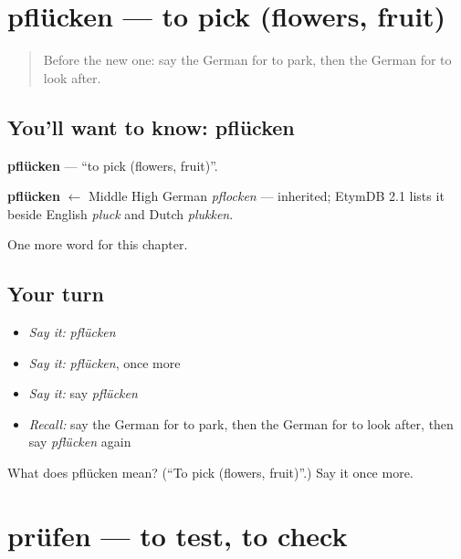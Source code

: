 \section[pflücken]{pflücken — to pick (flowers, fruit)}

\label{lesson:GE-C184-pfluecken}



\begin{quote}
Before the new one: say the German for to park, then the German for to look after.
\end{quote}

\subsection*{You'll want to know: pflücken}
\textbf{pflücken} — \textquotedblleft{}to pick (flowers, fruit)\textquotedblright{}.

\begin{cousinweb}
\textbf{pflücken} $\leftarrow$ Middle High German \emph{pflocken} — inherited; EtymDB 2.1 lists it beside English \emph{pluck} and Dutch \emph{plukken}.
\end{cousinweb}

\begin{grammarlens}[title={What you've built}]
One more word for this chapter.
\end{grammarlens}

\subsection*{Your turn}
\begin{itemize}
\raggedright
  \item \emph{Say it:} \emph{pflücken}
  \item \emph{Say it:} \emph{pflücken}, once more
  \item \emph{Say it:} say \emph{pflücken}
  \item \emph{Recall:} say the German for to park, then the German for to look after, then say \emph{pflücken} again
\end{itemize}

\begin{tcolorbox}[breakable,colback=teal!4,colframe=teal!35!black,title={Before you move on}]
What does pflücken mean? (\textquotedblleft{}To pick (flowers, fruit)\textquotedblright{}.) Say it once more.
\end{tcolorbox}
\section[prüfen]{prüfen — to test, to check}

